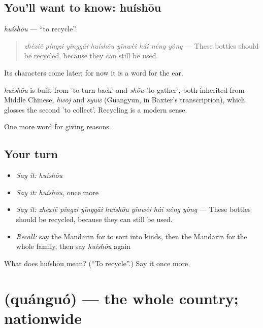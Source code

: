 \subsection*{You'll want to know: huíshōu}
\emph{huíshōu} — \textquotedblleft{}to recycle\textquotedblright{}.

\begin{quote}
\emph{zhèxiē píngzi yīnggāi huíshōu yīnwèi hái néng yòng} — These bottles should be recycled, because they can still be used.
\end{quote}

Its characters come later; for now it is a word for the ear.

\begin{cousinweb}
\emph{huíshōu} is built from  'to turn back' and \emph{shōu} 'to gather', both inherited from Middle Chinese, \emph{hwoj} and \emph{syuw} (Guangyun, in Baxter's transcription), which glosses the second 'to collect'. Recycling is a modern sense.
\end{cousinweb}

\begin{grammarlens}[title={What you've built}]
One more word for giving reasons.
\end{grammarlens}

\subsection*{Your turn}
\begin{itemize}
\raggedright
  \item \emph{Say it:} \emph{huíshōu}
  \item \emph{Say it:} \emph{huíshōu}, once more
  \item \emph{Say it:} \emph{zhèxiē píngzi yīnggāi huíshōu yīnwèi hái néng yòng} — These bottles should be recycled, because they can still be used.
  \item \emph{Recall:} say the Mandarin for to sort into kinds, then the Mandarin for the whole family, then say \emph{huíshōu} again
\end{itemize}

\begin{tcolorbox}[breakable,colback=teal!4,colframe=teal!35!black,title={Before you move on}]
What does huíshōu mean? (\textquotedblleft{}To recycle\textquotedblright{}.) Say it once more.
\end{tcolorbox}
\section[\texorpdfstring{\zh{全国} (quánguó)}{全国 (quánguó)}]{ (quánguó) — the whole country; nationwide}


